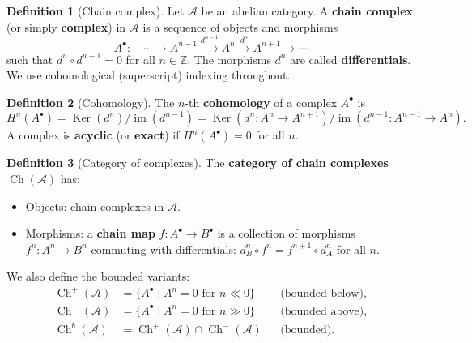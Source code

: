 \documentclass[a4paper,12pt]{book}
\DeclareMathOperator{\im}{im}
\DeclareMathOperator{\Ker}{Ker}
\theoremstyle{definition}
\newtheorem{definition}{Definition}[section]
\theoremstyle{plain}
\theoremstyle{remark}
\begin{document}
\begin{definition}[Chain complex]\label{def:chain-complex}
Let $\mathcal{A}$ be an abelian category. A \textbf{chain complex} (or simply \textbf{complex})
in $\mathcal{A}$ is a sequence of objects and morphisms
\[
    A^\bullet \colon \quad \cdots \longrightarrow A^{n-1} \xrightarrow{d^{n-1}} A^n
    \xrightarrow{d^n} A^{n+1} \longrightarrow \cdots
\]
such that $d^n \circ d^{n-1} = 0$ for all $n \in \mathbb{Z}$. The morphisms $d^n$ are
called \textbf{differentials}. We use cohomological (superscript)
indexing throughout.
\end{definition}

\begin{definition}[Cohomology]\label{def:cohomology-complex}
The $n$-th \textbf{cohomology} of a complex $A^\bullet$ is
\[
    H^n(A^\bullet) = \Ker(d^n) / \im(d^{n-1}) = \Ker(d^n \colon A^n \to A^{n+1}) /
    \im(d^{n-1} \colon A^{n-1} \to A^n).
\]
A complex is \textbf{acyclic} (or \textbf{exact}) if $H^n(A^\bullet) = 0$
for all $n$.
\end{definition}

\begin{definition}[Category of complexes]\label{def:complex-category}
The \textbf{category of chain complexes} $\operatorname{Ch}(\mathcal{A})$ has:
\begin{itemize}
    \item Objects: chain complexes in $\mathcal{A}$.
    \item Morphisms: a \textbf{chain map} $f \colon A^\bullet \to B^\bullet$
    is a collection of morphisms $f^n \colon A^n \to B^n$ commuting with differentials:
    $d_B^n \circ f^n = f^{n+1} \circ d_A^n$ for all $n$.
\end{itemize}
We also define the bounded variants:
\begin{align*}
    \operatorname{Ch}^+(\mathcal{A}) &= \{ A^\bullet \mid A^n = 0 \text{ for } n \ll 0 \}
    &&\text{(bounded below)}, \\
    \operatorname{Ch}^-(\mathcal{A}) &= \{ A^\bullet \mid A^n = 0 \text{ for } n \gg 0 \}
    &&\text{(bounded above)}, \\
    \operatorname{Ch}^b(\mathcal{A}) &= \operatorname{Ch}^+(\mathcal{A}) \cap \operatorname{Ch}^-(\mathcal{A})
    &&\text{(bounded)}.
\end{align*}
\end{definition}
\end{document}

